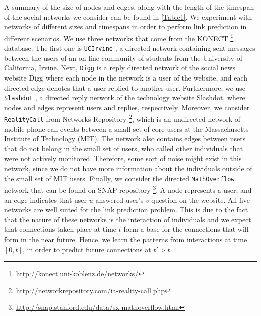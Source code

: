 \documentclass{acm_proc_article-sp}
\begin{document}


A summary of the size of nodes and edges, along with the length of the timespan of the social networks we consider can be found in \autoref{Table1}. We experiment with networks of different sizes and timespans in order to perform link prediction in different scenarios. We use three networks that come from the KONECT \footnote{\url{http://konect.uni-koblenz.de/networks/}} database. The first one is \texttt{UCIrvine} \cite{opsahl2009clustering}, a directed network containing sent messages between the users of an on-line community of students from the University of California, Irvine. Next, \texttt{Digg} \cite{de2009social} is a reply directed network of the social news website Digg where each node in the network is a user of the website, and each directed edge denotes that a user replied to another user. Furthermore, we use \texttt{Slashdot} \cite{gomez2008statistical}, a directed reply network of the technology website Slashdot, where nodes and edges represent users and replies, respectively. Moreover, we consider \texttt{RealityCall} \cite{eagle2006reality, nr} from Networks Repository \footnote{\url{http://networkrepository.com/ia-reality-call.php}}, which is an undirected network of mobile phone call events between a small set of core users at the Massachusetts Institute of Technology (MIT). The network also contains edges between users that do not belong in the small set of users, who called other individuals that were not actively monitored. Therefore, some sort of noise might exist in this network, since we do not have more information about the individuals outside of the small set of MIT users. Finally, we consider the directed \texttt{MathOverflow} network \cite{Paranjape:2017:MTN:3018661.3018731} that can be found on SNAP repository \footnote{\url{http://snap.stanford.edu/data/sx-mathoverflow.html}}. A node represents a user, and an edge indicates that user $u$ answered user's $v$ question on the website. All five networks are well suited for the link prediction problem. This is due to the fact that the nature of these networks is the interaction of individuals and we expect that connections taken place at time $t$ form a base for the connections that will form in the near future. Hence, we learn the patterns from interactions at time $[0,t]$, in order to predict future connections at $t' > t$.
\end{document}
